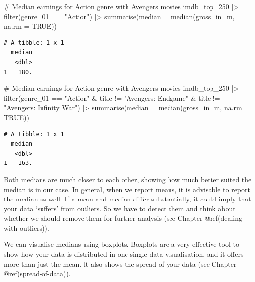 \documentclass[
  letterpaper,
]{krantz}
\makeatletter
\newenvironment{Shaded}{\begin{snugshade}}{\end{snugshade}}
\newcommand{\AttributeTok}[1]{\textcolor[rgb]{0.40,0.45,0.13}{#1}}
\newcommand{\CommentTok}[1]{\textcolor[rgb]{0.37,0.37,0.37}{#1}}
\newcommand{\ConstantTok}[1]{\textcolor[rgb]{0.56,0.35,0.01}{#1}}
\newcommand{\FunctionTok}[1]{\textcolor[rgb]{0.28,0.35,0.67}{#1}}
\newcommand{\NormalTok}[1]{\textcolor[rgb]{0.00,0.23,0.31}{#1}}
\newcommand{\SpecialCharTok}[1]{\textcolor[rgb]{0.37,0.37,0.37}{#1}}
\newcommand{\StringTok}[1]{\textcolor[rgb]{0.13,0.47,0.30}{#1}}
\newenvironment{kframe}{%
\medskip{}
\setlength{\fboxsep}{.8em}
 \def\at@end@of@kframe{}%
 \ifinner\ifhmode%
  \def\at@end@of@kframe{\end{minipage}}%
  \begin{minipage}{\columnwidth}%
 \fi\fi%
 \def\FrameCommand##1{\hskip\@totalleftmargin \hskip-\fboxsep
 \colorbox{shadecolor}{##1}\hskip-\fboxsep
     \hskip-\linewidth \hskip-\@totalleftmargin \hskip\columnwidth}%
 \MakeFramed {\advance\hsize-\width
   \@totalleftmargin\z@ \linewidth\hsize
   \@setminipage}}%
 {\par\unskip\endMakeFramed%
 \at@end@of@kframe}
\renewenvironment{Shaded}{\begin{kframe}}{\end{kframe}}
\makeatother
\begin{document}
\begin{Shaded}
\begin{Highlighting}[]
\CommentTok{\# Median earnings for Action genre with Avengers movies}
\NormalTok{imdb\_top\_250 }\SpecialCharTok{|\textgreater{}}
  \FunctionTok{filter}\NormalTok{(genre\_01 }\SpecialCharTok{==} \StringTok{"Action"}\NormalTok{) }\SpecialCharTok{|\textgreater{}}
  \FunctionTok{summarise}\NormalTok{(}\AttributeTok{median =} \FunctionTok{median}\NormalTok{(gross\_in\_m, }\AttributeTok{na.rm =} \ConstantTok{TRUE}\NormalTok{))}
\end{Highlighting}
\end{Shaded}

\begin{verbatim}
# A tibble: 1 x 1
  median
   <dbl>
1   180.
\end{verbatim}

\begin{Shaded}
\begin{Highlighting}[]
\CommentTok{\# Median earnings for Action genre with Avengers movies}
\NormalTok{imdb\_top\_250 }\SpecialCharTok{|\textgreater{}}
  \FunctionTok{filter}\NormalTok{(genre\_01 }\SpecialCharTok{==} \StringTok{"Action"} \SpecialCharTok{\&}
\NormalTok{           title }\SpecialCharTok{!=} \StringTok{"Avengers: Endgame"} \SpecialCharTok{\&}
\NormalTok{           title }\SpecialCharTok{!=} \StringTok{"Avengers: Infinity War"}\NormalTok{) }\SpecialCharTok{|\textgreater{}}
  \FunctionTok{summarise}\NormalTok{(}\AttributeTok{median =} \FunctionTok{median}\NormalTok{(gross\_in\_m, }\AttributeTok{na.rm =} \ConstantTok{TRUE}\NormalTok{))}
\end{Highlighting}
\end{Shaded}

\begin{verbatim}
# A tibble: 1 x 1
  median
   <dbl>
1   163.
\end{verbatim}

Both medians are much closer to each other, showing how much better
suited the median is in our case. In general, when we report means, it
is advisable to report the median as well. If a mean and median differ
substantially, it could imply that your data `suffers' from outliers. So
we have to detect them and think about whether we should remove them for
further analysis (see Chapter @ref(dealing-with-outliers)).

We can visualise medians using boxplots. Boxplots are a very effective
tool to show how your data is distributed in one single data
visualisation, and it offers more than just the mean. It also shows the
spread of your data (see Chapter @ref(spread-of-data)).
\end{document}
